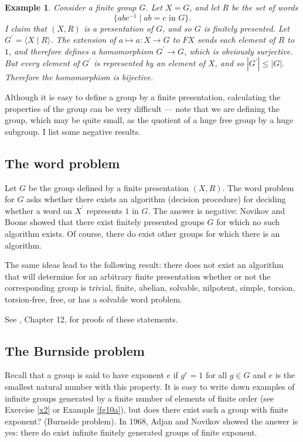 \documentclass[a4paper,11pt,final,openany]{memoir}%
\newtheorem{example}[X]{Example}
\theoremstyle{nonumberplain}
\begin{document}
\begin{example}
\label{fg11} Consider a finite group $G$. Let $X=G$, and let $R$ be the set of
words
\[
\{abc^{-1}\mid ab=c\text{ in }G\}.
\]
I claim that $(X,R)$ is a presentation of $G$, and so $G$ is finitely
presented. Let $G^{\prime}=\langle X\mid R\rangle$. The extension of $a\mapsto
a\colon X\rightarrow G$ to $FX$ sends each element of $R$ to $1$, and
therefore defines a homomorphism $G^{\prime}\rightarrow G$, which is obviously
surjective. But every element of $G^{\prime}$ is represented by an element of
$X$, and so $|G^{\prime}|\leq|G|$. Therefore the homomorphism is bijective.
\end{example}

Although it is easy to define a group by a finite presentation, calculating
the properties of the group can be very difficult --- note that we are
defining the group, which may be quite small, as the quotient of a huge free
group by a huge subgroup. I list some negative results.

\subsection{The word problem%
%
}

Let $G$ be the group defined by a finite presentation $(X,R)$. The word
problem for $G$ asks whether there exists an algorithm (decision procedure)
for deciding whether a word on $X^{\prime}$ represents $1$ in $G$. The answer
is negative: Novikov and Boone showed that there exist finitely presented
groups $G$ for which no such algorithm exists. Of course, there do exist other
groups for which there is an algorithm.

The same ideas lead to the following result: there does not exist an algorithm
that will determine for an arbitrary finite presentation whether or not the
corresponding group is trivial, finite, abelian, solvable, nilpotent, simple,
torsion, torsion-free, free, or has a solvable word problem.

See \cite{rotman1995}, Chapter 12, for proofs of these statements.

\subsection{The Burnside problem}%

%
\label{burnside}

Recall that a group is said to have exponent%
$e$ if $g^{e}=1$ for all $g\in G$ and $e$ is the smallest natural number with
this property. It is easy to write down examples of infinite groups generated
by a finite number of elements of finite order (see Exercise \ref{x2} or
Example \ref{fg10a}), but does there exist such a group with finite exponent?
(Burnside problem). In 1968, Adjan and Novikov showed the answer is yes: there
do exist infinite finitely generated groups of finite exponent.
\end{document}
